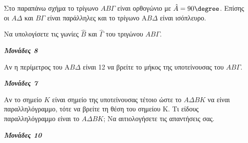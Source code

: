 \documentclass[11pt,a4paper,twoside]{book}
\newcommand{\monades}[1]{
\hspace*{\fill}
\textbf{\textit{\textcolor{maincolor}{Μονάδες #1}}}}
\begin{document}
\begin{center}
\end{center}

Στο παραπάνω σχήμα το τρίγωνο $AB\varGamma $ είναι ορθογώνιο με $\hat{A} = 90\degree$. Επίσης οι $A\varDelta  $ και $B\varGamma $ είναι παράλληλες και το τρίγωνο Α$B\varDelta  $ είναι ισόπλευρο.

\begin{alist}
\item Να υπολογίσετε τις γωνίες $\hat{B}$ και $\hat{\varGamma }$ του τριγώνου $AB\varGamma $.

\monades{8}

\item Αν η περίμετρος του Α$B\varDelta  $ είναι 12 να βρείτε το μήκος της υποτείνουσας του $AB\varGamma $.

\monades{7}

\item Αν το σημείο $K$ είναι σημείο της υποτείνουσας τέτοιο ώστε το $A\varDelta  BK$ να είναι παραλληλόγραμμο, τότε να βρείτε τη θέση του σημείου Κ. Τι είδους παραλληλόγραμμο είναι το $A\varDelta  BK$; Να αιτιολογήσετε τις απαντήσεις σας.

\monades{10}
\end{alist}
\end{document}
